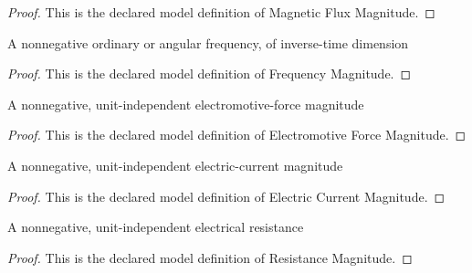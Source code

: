 \begin{proof}
  This is the declared model definition of Magnetic Flux Magnitude.
\end{proof}
\begin{definition}
  \label{def:physics:phyx-mini-0932:phyxminiproblems-problemphyxmini0932-frequencymagnitude}
  A nonnegative ordinary or angular frequency, of inverse-time dimension
\end{definition}
\begin{proof}
  This is the declared model definition of Frequency Magnitude.
\end{proof}
\begin{definition}
  \label{def:physics:phyx-mini-0932:phyxminiproblems-problemphyxmini0932-electromotiveforcemagnitude}
  A nonnegative, unit-independent electromotive-force magnitude
\end{definition}
\begin{proof}
  This is the declared model definition of Electromotive Force Magnitude.
\end{proof}
\begin{definition}
  \label{def:physics:phyx-mini-0932:phyxminiproblems-problemphyxmini0932-electriccurrentmagnitude}
  A nonnegative, unit-independent electric-current magnitude
\end{definition}
\begin{proof}
  This is the declared model definition of Electric Current Magnitude.
\end{proof}
\begin{definition}
  \label{def:physics:phyx-mini-0932:phyxminiproblems-problemphyxmini0932-resistancemagnitude}
  A nonnegative, unit-independent electrical resistance
\end{definition}
\begin{proof}
  This is the declared model definition of Resistance Magnitude.
\end{proof}
